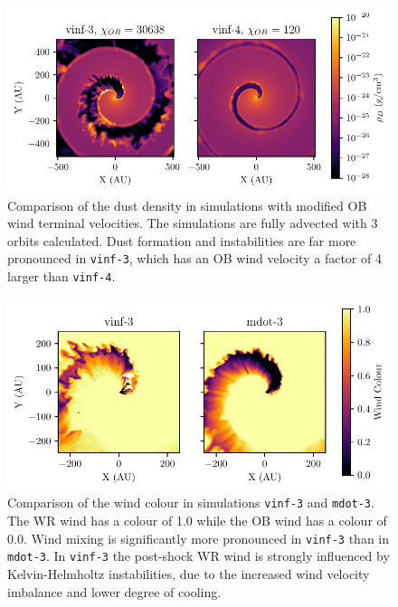 




\begin{figure}
  \centering
  \includegraphics{assets/results/vinf/vinf-rhod.pdf}
  \caption[OB terminal velocity wind dust comparison]{Comparison of the dust density in simulations with modified OB wind terminal velocities. The simulations are fully advected with 3 orbits calculated. Dust formation and instabilities are far more pronounced in \texttt{vinf-3}, which has an OB wind velocity a factor of 4 larger than \texttt{vinf-4}.}
  \label{fig:obvinfzcomp}
\end{figure}

\begin{figure}
  \centering
  \includegraphics{assets/results/mixed/eta-004-comparison-r0.pdf}
  \caption[Wind colour comparison of $\eta = 0.04$ winds]{Comparison of the wind colour in simulations \texttt{vinf-3} and \texttt{mdot-3}. The WR wind has a colour of 1.0 while the OB wind has a colour of 0.0. Wind mixing is significantly more pronounced in \texttt{vinf-3} than in \texttt{mdot-3}. In \texttt{vinf-3} the post-shock WR wind is strongly influenced by Kelvin-Helmholtz instabilities, due to the increased wind velocity imbalance and lower degree of cooling.}
  \label{fig:eta004comparisoncolour}
\end{figure}

